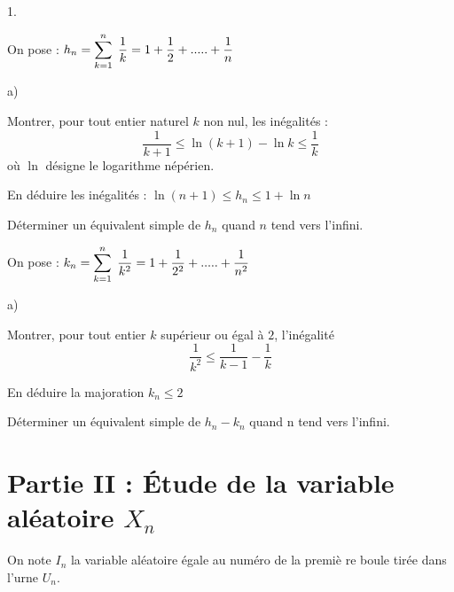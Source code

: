 \documentclass[11pt]{article}%
\begin{document}
\begin{noliste}{1.}
\item On pose : $h_{n}=\DSum{k=1}{n}\dfrac{1}{k}=1+\dfrac{1}{2}%
+.....+\dfrac{1}{n}$

\begin{noliste}{a)}
\item Montrer, pour tout entier naturel $k$ non nul, les inégalités : 
\begin{equation*}
\dfrac{1}{k+1}\leqslant \ln (k+1)-\ln k\leqslant \dfrac{1}{k}
\end{equation*}%
où $\ln $ désigne le logarithme népérien.

\item En déduire les inégalités : $\ln (n+1)\leqslant h_{n}\leqslant 
1+\ln n$

\item Déterminer un équivalent simple de $h_{n}$ quand $n$ tend vers
l'infini.
\end{noliste}

\item On pose : 
$k_{n}=\DSum{k=1}{n}\dfrac{1}{k^{2}}=1+\dfrac{1}{%
2^{2}}+.....+\dfrac{1}{n^{2}}$

\begin{noliste}{a)}
\item Montrer, pour tout entier $k$ supérieur ou égal à $2$, 
l'inégalité 
\[
\dfrac{1}{k^{2}}\leq \dfrac{1}{k-1}-\dfrac{1}{k}
\]

\item En déduire la majoration $k_{n}\leq 2$

\item Déterminer un équivalent simple de $h_{n}-k_{n}$ quand n tend vers
l'infini.
\end{noliste}
\end{noliste}

\section*{Partie II : Étude de la variable aléatoire $X_{n}$}

\noindent On note $I_{n}$ la variable aléatoire égale au numéro de la 
premiè%
re boule tirée dans l'urne $U_{n}$.
\end{document}

